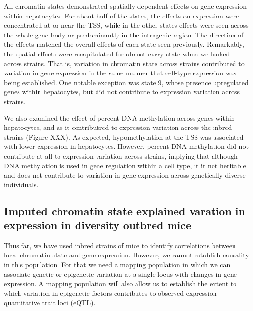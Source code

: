 \documentclass[10pt,letterpaper]{article}
\begin{document}
All chromatin states demonstrated spatially dependent effects on gene
expression within hepatocytes. For about half of the states, the effects
on expression were concentrated at or near the TSS, while in the other
states effects were seen across the whole gene body or predominantly in
the intragenic region. The direction of the effects matched the overall
effects of each state seen previously. Remarkably, the spatial effects
were recapitulated for almost every state when we looked across strains.
That is, variation in chromatin state across strains contributed to
variation in gene expression in the same manner that cell-type
expression was being established. One notable exception was state 9,
whose presence upregulated genes within hepatocytes, but did not
contribute to expression variation across strains.

We also examined the effect of percent DNA methylation across genes
within hepatocytes, and as it contributred to expression variation
across the inbred strains (Figure XXX). As expected, hypomethylation at
the TSS was associated with lower expression in hepatocytes. However,
percent DNA methylation did not contribute at all to expression
variation across strains, implying that although DNA methylation is used
in gene regulation within a cell type, it it not heritable and does not
contribute to variation in gene expression across genetically diverse
individuals.

\hypertarget{imputed-chromatin-state-explained-varation-in-expression-in-diversity-outbred-mice}{%
\subsection{Imputed chromatin state explained varation in expression in
diversity outbred
mice}\label{imputed-chromatin-state-explained-varation-in-expression-in-diversity-outbred-mice}}

Thus far, we have used inbred strains of mice to identify correlations
between local chromatin state and gene expression. However, we cannot
establish causality in this population. For that we need a mapping
population in which we can associate genetic or epigenetic variation at
a single locus with changes in gene expression. A mapping population
will also allow us to establish the extent to which variation in
epigenetic factors contributes to observed expression quantitative trait
loci (eQTL).
\end{document}
